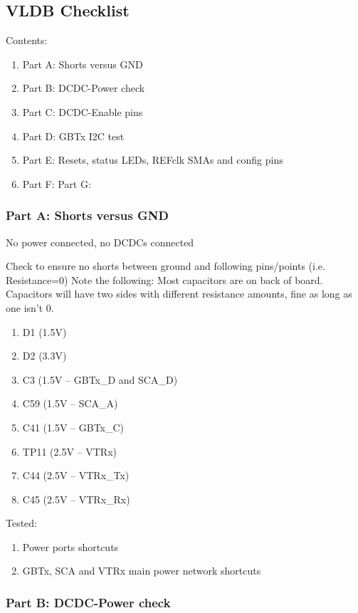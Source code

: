 \subsection{VLDB Checklist}

Contents:
\begin{enumerate}
    \item Part A: Shorts versus GND
    \item Part B: DCDC-Power check
    \item Part C: DCDC-Enable pins
    \item Part D: GBTx I2C test
    \item Part E: Resets, status LEDs, REFclk SMAs and config pins
    \item Part F:
    \Item Part G:
\end{enumerate}

\subsubsection{Part A: Shorts versus GND}

No power connected, no DCDCs connected

Check to ensure no shorts between ground and following pins/points (i.e. Resistance=0)
Note the following: Most capacitors are on back of board. Capacitors will have two sides with different resistance amounts, fine as long as one isn’t 0.

\begin{enumerate}
    \item D1 (1.5V)
    \item D2 (3.3V)
    \item C3 (1.5V – GBTx_D and SCA_D)
    \item C59 (1.5V – SCA_A)
    \item C41 (1.5V – GBTx_C)
    \item TP11 (2.5V – VTRx)
    \item C44 (2.5V – VTRx_Tx)
    \item C45 (2.5V – VTRx_Rx)
\end{enumerate}

Tested:
\begin{enumerate}
    \item Power ports shortcuts
    \item GBTx, SCA and VTRx main power network shortcuts
\end{enumerate}


\subsubsection{Part B: DCDC-Power check}

